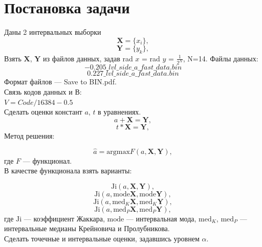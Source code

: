 \documentclass[a4paper,12pt]{article}
\begin{document}
\newpage
\section{Постановка задачи}
Даны 2 интервальных выборки
\begin{equation}
    \mathbf{X}=\{x_i\},
\end{equation}
\begin{equation}
    \mathbf{Y}=\{y_k\},
\end{equation}
Взять $\mathbf{X}$, $\mathbf{Y}$ из файлов данных, задав rad $x$ = rad $y$ = $\frac{1}{2^N}$, N=14.
Файлы данных:
\[−0.205\_lvl\_side\_a\_fast\_data.bin\]
\[0.227\_lvl\_side\_a\_fast\_data.bin\]
Формат файлов — Save to BIN.pdf.\\
Связь кодов данных и В:\\
$V = Code/16384 − 0.5$ \\
Сделать оценки констант $a$, $t$ в уравнениях.
\begin{equation}
    a+\mathbf{X}=\mathbf{Y},
\end{equation}
\begin{equation}
    t*\mathbf{X}=\mathbf{Y},
\end{equation}
Метод решения:

\begin{equation}
    \hat a = \text{argmax} F(a, \mathbf{X}, \mathbf{Y}),
\end{equation}
где \( F \) --- функционал.
\\
В качестве функционала взять варианты:

  \begin{equation} \label{eq:F_1}
    \text{Ji} (a, \mathbf{X}, \mathbf{Y}),
  \end{equation}
  \begin{equation} \label{eq:F_2}
    \text{Ji} (a, \text{mode} \mathbf{X}, \text{mode} \mathbf{Y}),
  \end{equation}
  \begin{equation} \label{eq:F_3}
    \text{Ji} (a, \text{med}_K \mathbf{X}, \text{med}_K \mathbf{Y}),
  \end{equation}
  \begin{equation} \label{eq:F_4}
    \text{Ji} (a, \text{med}_P \mathbf{X}, \text{med}_P \mathbf{Y}),
  \end{equation}
где \( \text{Ji} \) --- коэффициент Жаккара, \( \text{mode} \) --- интервальная мода, \( \text{med}_K \), \( \text{med}_P \) --- интервальные медианы Крейновича и Пролубникова.\\
Сделать точечные и интервальные оценки, задавшись уровнем \( \alpha \). 
\end{document}
